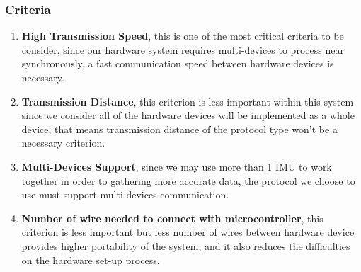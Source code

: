 \subsubsection{Criteria}
\begin{enumerate}
	\item \textbf{High Transmission Speed}, this is one of the most critical criteria to be consider, since our hardware system requires multi-devices to process near synchronously, a fast communication speed between hardware devices is necessary.
	\item \textbf{Transmission Distance}, this criterion is less important within this system since we consider all of the hardware devices will be implemented as a whole device, that means transmission distance of the protocol type won’t be a necessary criterion.
	\item \textbf{Multi-Devices Support}, since we may use more than 1 IMU to work together in order to gathering more accurate data, the protocol we choose to use must support multi-devices communication.
	\item \textbf{Number of wire needed to connect with microcontroller}, this criterion is less important but less number of wires between hardware device provides higher portability of the system, and it also reduces the difficulties on the hardware set-up process.\\
\end{enumerate}

